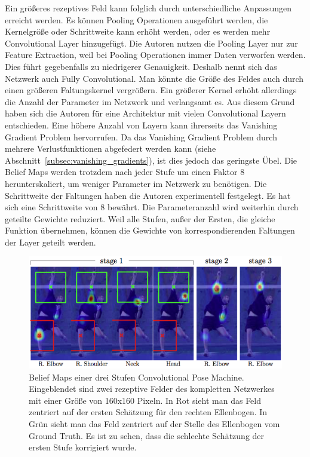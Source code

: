 \documentclass[journal, a4paper]{IEEEtran}
\begin{document}
        Ein größeres rezeptives Feld kann folglich durch unterschiedliche Anpassungen erreicht werden. Es können Pooling Operationen ausgeführt werden, die Kernelgröße oder Schrittweite kann erhöht werden, oder es werden mehr Convolutional Layer hinzugefügt.
        Die Autoren nutzen die Pooling Layer nur zur Feature Extraction, weil bei Pooling Operationen immer Daten verworfen werden. Dies führt gegebenfalls zu niedrigerer Genauigkeit. Deshalb nennt sich das Netzwerk auch Fully Convolutional. Man könnte die Größe des Feldes auch durch einen größeren Faltungskernel vergrößern. Ein größerer Kernel erhöht allerdings die Anzahl der Parameter im Netzwerk und verlangsamt es. 
        Aus diesem Grund haben sich die Autoren für eine Architektur mit vielen Convolutional Layern entschieden. Eine höhere Anzahl von Layern kann ihrerseits das Vanishing Gradient Problem hervorrufen. Da das Vanishing Gradient Problem durch mehrere Verlustfunktionen abgefedert werden kann (siehe Abschnitt~\ref{subsec:vanishing_gradients}), ist dies jedoch das geringste Übel. Die Belief Maps werden trotzdem nach jeder Stufe um einen Faktor 8 herunterskaliert, um weniger Parameter im Netzwerk zu benötigen. Die Schrittweite der Faltungen haben die Autoren experimentell festgelegt. Es hat sich eine Schrittweite von 8 bewährt. Die Parameteranzahl wird weiterhin durch geteilte Gewichte reduziert. Weil alle Stufen, außer der Ersten, die gleiche Funktion übernehmen, können die Gewichte von korrespondierenden Faltungen der Layer geteilt werden.

        \begin{figure}[!hbt]
                \begin{center}
                \includegraphics[width=1\columnwidth]{receptive_field.png}
                \caption{Belief Maps einer drei Stufen Convolutional Pose Machine. Eingeblendet sind zwei rezeptive Felder des kompletten Netzwerkes mit einer Größe von 160x160 Pixeln. In Rot sieht man das Feld zentriert auf der ersten Schätzung für den rechten Ellenbogen. In Grün sieht man das Feld zentriert auf der Stelle des Ellenbogen vom Ground Truth. Es ist zu sehen, dass die schlechte Schätzung der ersten Stufe korrigiert wurde.}
                \label{fig:receptive_field}
                \end{center}
        \end{figure}
\end{document}
